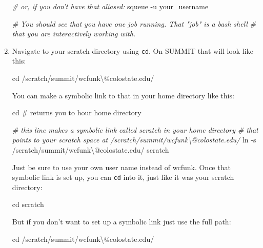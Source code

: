 \documentclass[]{krantz}
\makeatletter
\newenvironment{Shaded}{\begin{snugshade}}{\end{snugshade}}
\newcommand{\BuiltInTok}[1]{#1}
\newcommand{\CommentTok}[1]{\textcolor[rgb]{0.37,0.37,0.37}{\textit{#1}}}
\newcommand{\ExtensionTok}[1]{#1}
\newcommand{\FunctionTok}[1]{\textcolor[rgb]{0,0,0}{#1}}
\newcommand{\NormalTok}[1]{#1}
\newenvironment{kframe}{%
\medskip{}
\setlength{\fboxsep}{.8em}
 \def\at@end@of@kframe{}%
 \ifinner\ifhmode%
  \def\at@end@of@kframe{\end{minipage}}%
  \begin{minipage}{\columnwidth}%
 \fi\fi%
 \def\FrameCommand##1{\hskip\@totalleftmargin \hskip-\fboxsep
 \colorbox{shadecolor}{##1}\hskip-\fboxsep
     \hskip-\linewidth \hskip-\@totalleftmargin \hskip\columnwidth}%
 \MakeFramed {\advance\hsize-\width
   \@totalleftmargin\z@ \linewidth\hsize
   \@setminipage}}%
 {\par\unskip\endMakeFramed%
 \at@end@of@kframe}
\renewenvironment{Shaded}{\begin{kframe}}{\end{kframe}}
\makeatother
\begin{document}
\begin{enumerate}
\begin{Shaded}
\begin{Highlighting}[]
\CommentTok{# or, if you don't have that aliased:}
\ExtensionTok{squeue}\NormalTok{ -u your_username}

\CommentTok{# You should see that you have one job running.  That "job" is a bash shell}
\CommentTok{# that you are interactively working with.}
\end{Highlighting}
\end{Shaded}
\item
  Navigate to your scratch directory using \texttt{cd}. On SUMMIT that will look like this:

\begin{Shaded}
\begin{Highlighting}[]
\BuiltInTok{cd}\NormalTok{ /scratch/summit/wcfunk\textbackslash{}@colostate.edu/}
\end{Highlighting}
\end{Shaded}

  You can make a symbolic link to that in your home directory like this:

\begin{Shaded}
\begin{Highlighting}[]
\BuiltInTok{cd}\NormalTok{  # returns you to hour home directory}

\CommentTok{# this line makes a symbolic link called scratch in your home directory}
\CommentTok{# that points to your scratch space at /scratch/summit/wcfunk\textbackslash{}@colostate.edu/}
\FunctionTok{ln}\NormalTok{ -s /scratch/summit/wcfunk\textbackslash{}@colostate.edu/ scratch}
\end{Highlighting}
\end{Shaded}

  Just be sure to use your own user name instead of wcfunk. Once that symbolic link is set up, you can
  \texttt{cd} into it, just like it was your scratch directory:

\begin{Shaded}
\begin{Highlighting}[]
\BuiltInTok{cd}\NormalTok{ scratch}
\end{Highlighting}
\end{Shaded}

  But if you don't want to set up a symbolic link just use the full path:

\begin{Shaded}
\begin{Highlighting}[]
\BuiltInTok{cd}\NormalTok{ /scratch/summit/wcfunk\textbackslash{}@colostate.edu/}
\end{Highlighting}
\end{Shaded}


\end{enumerate}
\end{document}
